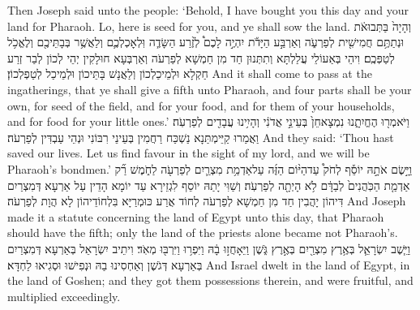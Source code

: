 {Then Joseph said unto the people: ‘Behold, I have bought you this day and your land for Pharaoh. Lo, here is seed for you, and ye shall sow the land.}{}
{וְהָיָה֙ בַּתְּבוּאֹ֔ת וּנְתַתֶּ֥ם חֲמִישִׁ֖ית לְפַרְעֹ֑ה וְאַרְבַּ֣ע הַיָּדֹ֡ת יִהְיֶ֣ה לָכֶם֩ לְזֶ֨רַע הַשָּׂדֶ֧ה וּֽלְאׇכְלְכֶ֛ם וְלַאֲשֶׁ֥ר בְּבָתֵּיכֶ֖ם וְלֶאֱכֹ֥ל לְטַפְּכֶֽם׃}
{וִיהֵי בְּאַעוֹלֵי עֲלַלְתָּא וְתִתְּנוּן חַד מִן חַמְשָׁא לְפַרְעֹה וְאַרְבְּעָא חוּלָקִין יְהֵי לְכוֹן לְבַר זְרַע חַקְלָא וּלְמֵיכַלְכוֹן וְלַאֲנָשׁ בָּתֵּיכוֹן וּלְמֵיכַל לְטַפְלְכוֹן׃}
{And it shall come to pass at the ingatherings, that ye shall give a fifth unto Pharaoh, and four parts shall be your own, for seed of the field, and for your food, and for them of your households, and for food for your little ones.’}{}
{וַיֹּאמְר֖וּ הֶחֱיִתָ֑נוּ נִמְצָא\maqqaf חֵן֙ בְּעֵינֵ֣י אֲדֹנִ֔י וְהָיִ֥ינוּ עֲבָדִ֖ים לְפַרְעֹֽה׃}
{וַאֲמַרוּ קַיֵּימְתַּנָא נַשְׁכַּח רַחֲמִין בְּעֵינֵי רִבּוֹנִי וּנְהֵי עַבְדִּין לְפַרְעֹה׃}
{And they said: ‘Thou hast saved our lives. Let us find favour in the sight of my lord, and we will be Pharaoh’s bondmen.’}{}
{וַיָּ֣שֶׂם אֹתָ֣הּ יוֹסֵ֡ף לְחֹק֩ עַד\maqqaf הַיּ֨וֹם הַזֶּ֜ה עַל\maqqaf אַדְמַ֥ת מִצְרַ֛יִם לְפַרְעֹ֖ה לַחֹ֑מֶשׁ רַ֞ק אַדְמַ֤ת הַכֹּֽהֲנִים֙ לְבַדָּ֔ם לֹ֥א הָיְתָ֖ה לְפַרְעֹֽה׃}
{וְשַׁוִּי יָתַהּ יוֹסֵף לִגְזֵירָא עַד יוֹמָא הָדֵין עַל אַרְעָא דְּמִצְרַיִם דִּיהוֹן יָהֲבִין חַד מִן חַמְשָׁא לְפַרְעֹה לְחוֹד אֲרַע כּוּמְרַיָּא בִּלְחוֹדֵיהוֹן לָא הֲוָת לְפַרְעֹה׃}
{And Joseph made it a statute concerning the land of Egypt unto this day, that Pharaoh should have the fifth; only the land of the priests alone became not Pharaoh’s.}{}
{וַיֵּ֧שֶׁב יִשְׂרָאֵ֛ל בְּאֶ֥רֶץ מִצְרַ֖יִם בְּאֶ֣רֶץ גֹּ֑שֶׁן וַיֵּאָחֲז֣וּ בָ֔הּ וַיִּפְר֥וּ וַיִּרְבּ֖וּ מְאֹֽד׃}
{וִיתֵיב יִשְׂרָאֵל בְּאַרְעָא דְּמִצְרַיִם בְּאַרְעָא דְּגֹשֶׁן וְאַחְסִינוּ בַהּ וּנְפִישׁוּ וּסְגִיאוּ לַחְדָּא׃}
{And Israel dwelt in the land of Egypt, in the land of Goshen; and they got them possessions therein, and were fruitful, and multiplied exceedingly.}{}
